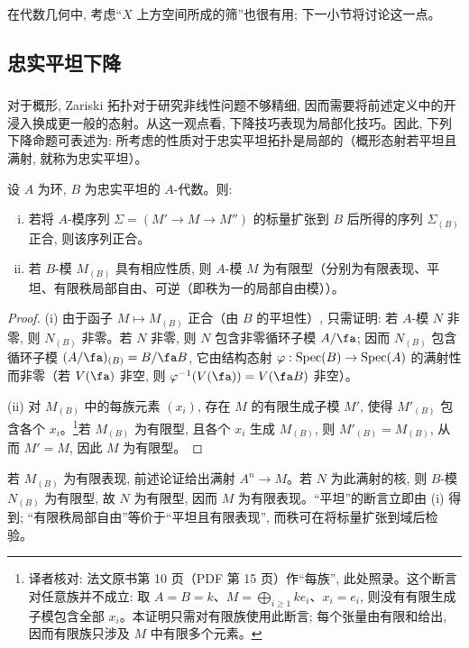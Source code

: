 在代数几何中, 考虑“$X$ 上方空间所成的筛”也很有用; 下一小节将讨论这一点。

\subsection{忠实平坦下降}\label{I:1-4}

\subsubsection{}\label{I:1-4-1}

对于概形, Zariski 拓扑对于研究非线性问题不够精细, 因而需要将前述定义中的开浸入换成更一般的态射。从这一观点看, 下降技巧表现为局部化技巧。因此, 下列下降命题可表述为: 所考虑的性质对于忠实平坦拓扑是局部的（概形态射若平坦且满射, 就称为忠实平坦）。

\begin{proposition}\label{I:1-4-2}
设 $A$ 为环, $B$ 为忠实平坦的 $A$-代数。则:
\begin{enumerate}[(i)]
  \item 若将 $A$-模序列 $\Sigma=(M'\to M\to M'')$ 的标量扩张到 $B$ 后所得的序列 $\Sigma_{(B)}$ 正合, 则该序列正合。
  \item 若 $B$-模 $M_{(B)}$ 具有相应性质, 则 $A$-模 $M$ 为有限型（分别为有限表现、平坦、有限秩局部自由、可逆（即秩为一的局部自由模））。
\end{enumerate}
\end{proposition}
\begin{proof}
(i) 由于函子 $M\mapsto M_{(B)}$ 正合（由 $B$ 的平坦性）, 只需证明: 若 $A$-模 $N$ 非零, 则 $N_{(B)}$ 非零。若 $N$ 非零, 则 $N$ 包含非零循环子模 $A/\fa$; 因而 $N_{(B)}$ 包含循环子模 $(A/\fa)_{(B)}=B/\fa B$, 它由结构态射 $\varphi:\operatorname{Spec}(B)\to\operatorname{Spec}(A)$ 的满射性而非零（若 $V(\fa)$ 非空, 则 $\varphi^{-1}(V(\fa))=V(\fa B)$ 非空）。

(ii) 对 $M_{(B)}$ 中的每族元素 $(x_i)$, 存在 $M$ 的有限生成子模 $M'$, 使得 $M'_{(B)}$ 包含各个 $x_i$。\footnote{译者核对: 法文原书第 10 页（PDF 第 15 页）作“每族”, 此处照录。这个断言对任意族并不成立: 取 $A=B=k$、$M=\bigoplus_{i\geqslant1}ke_i$、$x_i=e_i$, 则没有有限生成子模包含全部 $x_i$。本证明只需对有限族使用此断言; 每个张量由有限和给出, 因而有限族只涉及 $M$ 中有限多个元素。}若 $M_{(B)}$ 为有限型, 且各个 $x_i$ 生成 $M_{(B)}$, 则 $M'_{(B)}=M_{(B)}$, 从而 $M'=M$, 因此 $M$ 为有限型。
\end{proof}

若 $M_{(B)}$ 为有限表现, 前述论证给出满射 $A^n\to M$。若 $N$ 为此满射的核, 则 $B$-模 $N_{(B)}$ 为有限型, 故 $N$ 为有限型, 因而 $M$ 为有限表现。“平坦”的断言立即由 (i) 得到; “有限秩局部自由”等价于“平坦且有限表现”, 而秩可在将标量扩张到域后检验。

